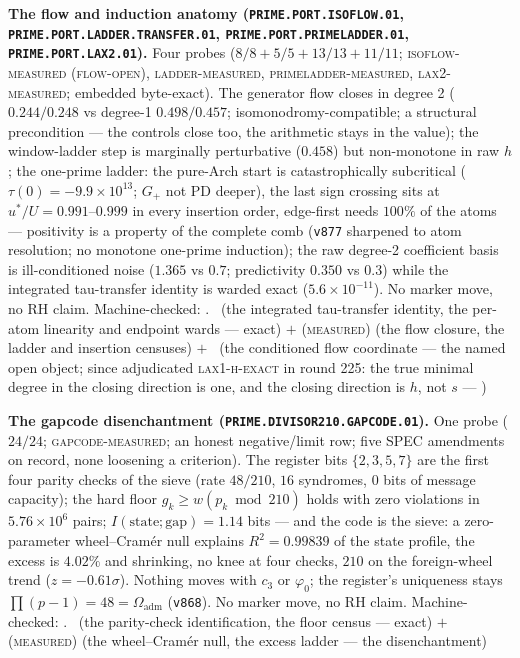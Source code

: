 \documentclass[11pt,a4paper]{article}
\newcommand{\Oadm}{\Omega_{\mathrm{adm}}}
\theoremstyle{definition}
\begin{document}
\par\smallskip\noindent\textbf{The flow and induction anatomy
(\texttt{PRIME.PORT.\allowbreak ISOFLOW.01},
\texttt{PRIME.PORT.LADDER.\allowbreak TRANSFER.01},
\texttt{PRIME.PORT.\allowbreak PRIMELADDER.01},
\texttt{PRIME.PORT.\allowbreak LAX2.01}).}
Four probes ($8/8 + 5/5 + 13/13 + 11/11$;
\textsc{isoflow-measured (flow-open)}, \textsc{ladder-measured},
\textsc{primeladder-measured}, \textsc{lax2-measured}; embedded
byte-exact).  The generator flow closes in degree 2
($0.244/0.248$ vs degree-1 $0.498/0.457$;
isomonodromy-compatible; a structural precondition --- the
controls close too, the arithmetic stays in the value); the
window-ladder step is marginally perturbative ($0.458$) but
non-monotone in raw $h$; the one-prime ladder: the pure-Arch
start is catastrophically subcritical ($\tau(0) =
-9.9\times10^{13}$; $G_+$ not PD deeper), the last sign crossing
sits at $u^{*}/U = 0.991$--$0.999$ in every insertion order,
edge-first needs $100\%$ of the atoms --- positivity is a
property of the complete comb (\texttt{v877} sharpened to atom
resolution; no monotone one-prime induction); the raw degree-2
coefficient basis is ill-conditioned noise ($1.365$ vs $0.7$;
predictivity $0.350$ vs $0.3$) while the integrated tau-transfer
identity is warded exact ($5.6\times10^{-11}$).  No marker move,
no RH claim.
Machine-checked: .
\mE\ (the integrated tau-transfer identity, the per-atom
linearity and endpoint wards --- exact) $+$ (\textsc{measured})
(the flow closure, the ladder and insertion censuses) $+$ \mO\
(the conditioned flow coordinate --- the named open object;
since adjudicated \textsc{lax1-h-exact} in round 225: the true
minimal degree in the closing direction is one, and the closing
direction is $h$, not $s$ ---
)
\par\smallskip

\par\smallskip\noindent\textbf{The gapcode disenchantment
(\texttt{PRIME.DIVISOR210.\allowbreak GAPCODE.01}).}
One probe ($24/24$; \textsc{gapcode-measured}; an honest
negative/limit row; five SPEC amendments on record, none
loosening a criterion).  The register bits $\{2,3,5,7\}$ are the
first four parity checks of the sieve (rate $48/210$, $16$
syndromes, $0$ bits of message capacity); the hard floor $g_k
\ge w(p_k \bmod 210)$ holds with zero violations in
$5.76\times10^{6}$ pairs; $I(\text{state};\text{gap}) = 1.14$
bits --- and the code is the sieve: a zero-parameter
wheel--Cram\'er null explains $R^2 = 0.99839$ of the state
profile, the excess is $4.02\%$ and shrinking, no knee at four
checks, $210$ on the foreign-wheel trend ($z = -0.61\sigma$).
Nothing moves with $c_3$ or $\varphi_0$; the register's
uniqueness stays $\prod(p-1) = 48 = \Oadm$ (\texttt{v868}).  No
marker move, no RH claim.
Machine-checked: .
\mE\ (the parity-check identification, the floor census ---
exact) $+$ (\textsc{measured}) (the wheel--Cram\'er null, the
excess ladder --- the disenchantment)
\par\smallskip
\end{document}
